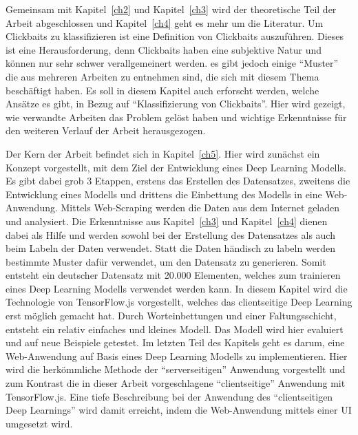 Gemeinsam mit Kapitel~\ref{ch2} und Kapitel~\ref{ch3} wird der theoretische Teil der Arbeit abgeschlossen und Kapitel~\ref{ch4} geht es mehr um die Literatur. Um Clickbaits zu klassifizieren ist eine Definition von Clickbaits auszuführen. Dieses ist eine Herausforderung, denn Clickbaits haben eine subjektive Natur und können nur sehr schwer verallgemeinert werden. es gibt jedoch einige \enquote{Muster} die aus mehreren Arbeiten zu entnehmen sind, die sich mit diesem Thema beschäftigt haben. Es soll in diesem Kapitel auch erforscht werden, welche Ansätze es gibt, in Bezug auf \enquote{Klassifizierung von Clickbaits}. Hier wird gezeigt, wie verwandte Arbeiten das Problem gelöst haben und wichtige Erkenntnisse für den weiteren Verlauf der Arbeit herausgezogen.




Der Kern der Arbeit befindet sich in Kapitel~\ref{ch5}. Hier wird zunächst ein Konzept vorgestellt, mit dem Ziel der Entwicklung eines Deep Learning Modells. Es gibt dabei grob 3 Etappen, erstens das Erstellen des Datensatzes, zweitens die Entwicklung eines Modells und drittens die Einbettung des Modells in eine Web-Anwendung. Mittels Web-Scraping werden die Daten aus dem Internet geladen und analysiert. Die Erkenntnisse aus Kapitel~\ref{ch3} und Kapitel~\ref{ch4} dienen dabei als Hilfe und werden sowohl bei der Erstellung des Datensatzes als auch beim Labeln der Daten verwendet. Statt die Daten händisch zu labeln werden bestimmte Muster dafür verwendet, um den Datensatz zu generieren. Somit entsteht ein deutscher Datensatz mit 20.000 Elementen, welches zum trainieren eines Deep Learning Modells verwendet werden kann. In diesem Kapitel wird die Technologie von TensorFlow.js vorgestellt, welches das clientseitige Deep Learning erst möglich gemacht hat. Durch Worteinbettungen und einer Faltungsschicht, entsteht ein relativ einfaches und kleines Modell. Das Modell wird hier evaluiert und auf neue Beispiele getestet. Im letzten Teil des Kapitels geht es darum, eine Web-Anwendung auf Basis eines Deep Learning Modells zu implementieren. Hier wird die herkömmliche Methode der \enquote{serverseitigen} Anwendung vorgestellt und zum Kontrast die in dieser Arbeit vorgeschlagene \enquote{clientseitige} Anwendung mit TensorFlow.js. Eine tiefe Beschreibung bei der Anwendung des \enquote{clientseitigen Deep Learnings} wird damit erreicht, indem die Web-Anwendung mittels einer UI umgesetzt wird.